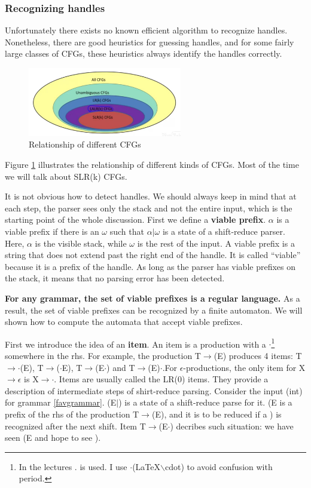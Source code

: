 \subsubsection{Recognizing handles}
Unfortunately there exists no known efficient algorithm to recognize handles. Nonetheless, there are good heuristics for guessing handles, and for some fairly large classes of CFGs, these heuristics always identify the handles correctly.
\begin{figure}[ht]
\centering
\includegraphics[width = 0.6\textwidth]{cfgvenn.jpg}
\caption{Relationship of different CFGs}\label{CFGsvenn}
\end{figure}
Figure \ref{CFGsvenn} illustrates the relationship of different kinds of CFGs. Most of the time we will talk about SLR(k) CFGs.

It is not obvious how to detect handles. We should always keep in mind that at each step, the parser sees only the stack and not the entire input, which is the starting point of the whole discussion. First we define a {\bf viable prefix}. $\alpha$ is a viable prefix if there is an $\omega$ such that $\alpha|\omega$ is a state of a shift-reduce parser. Here, $\alpha$ is the visible stack, while $\omega$ is the rest of the input. A viable prefix is a string that does not extend past the right end of the handle. It is called ``viable'' because it is a prefix of the handle. As long as the parser has viable prefixes on the stack, it means that no parsing error has been detected.

{\bf For any grammar, the set of viable prefixes is a regular language.} As a result, the set of viable prefixes can be recognized by a finite automaton. We will shown how to compute the automata that accept viable prefixes.

First we introduce the idea of an \textbf{item}. An item is a production with a $\cdot$\footnote{In the lectures . is used. I use $\cdot$(\LaTeX $\backslash$cdot) to avoid confusion with period.} somewhere in the rhs. For example, the production T$\rightarrow$(E) produces 4 items:  T$\rightarrow\cdot$(E), T$\rightarrow$($\cdot$E), T$\rightarrow$(E$\cdot$) and T$\rightarrow$(E)$\cdot$.For $\epsilon$-productions, the only item for X$\rightarrow\epsilon$ is X$\rightarrow\cdot$. Items are usually called the LR(0) items. They provide a description of intermediate steps of shirt-reduce parsing. Consider the input (int) for grammar \eqref{favgrammar}. (E$|$) is a state of a shift-reduce parse for it. (E is a prefix of the rhs of the production T$\rightarrow$(E), and it is to be reduced if a ) is recognized after the next shift. Item T$\rightarrow$(E$\cdot$) decribes such situation: we have seen (E and hope to see ).

